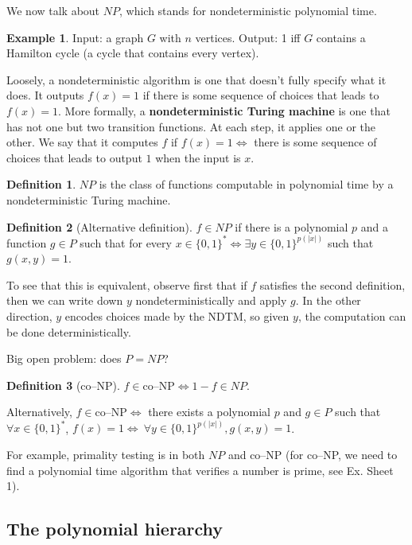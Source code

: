 \documentclass{article}
\theoremstyle{definition}
\newtheorem{example}{Example}[section]
\newtheorem{defn}{Definition}[section]
\begin{document}
We now talk about $NP$, which stands for nondeterministic polynomial time.
\begin{example}
    Input: a graph $G$ with $n$ vertices. Output: 1 iff $G$ contains a Hamilton cycle (a cycle that contains every vertex).
\end{example}
Loosely, a nondeterministic algorithm is one that doesn't fully specify what it does. It outputs $f(x)=1$ if there is some sequence of choices that leads to $f(x)=1$. More formally, a \textbf{nondeterministic Turing machine} is one that has not one but two transition functions. At each step, it applies one or the other. We say that it computes $f$ if $f(x)=1 \iff$ there is some sequence of choices that leads to output $1$ when the input is $x$.
\begin{defn}
    $NP$ is the class of functions computable in polynomial time by a nondeterministic Turing machine.
\end{defn}
\begin{defn}[Alternative definition]
    $f \in NP$ if there is a polynomial $p$ and a function $g \in P$ such that for every $x \in \{0,1\}^{*} \iff \exists y \in \{0,1\}^{p(|x|)}$ such that $g(x,y)=1$.
\end{defn}
To see that this is equivalent, observe first that if $f$ satisfies the second definition, then we can write down $y$ nondeterministically and apply $g$. In the other direction, $y$ encodes choices made by the NDTM, so given $y$, the computation can be done deterministically.
\vspace{1mm}
 
Big open problem: does $P = NP$?

\begin{defn}[co--NP]
    $f \in \text{co--NP} \iff 1-f \in NP$.
    \vspace{1mm}
     
    Alternatively, $f \in \text{co--NP} \iff$ there exists a polynomial $p$ and $g \in P$ such that $\forall x \in \{0,1\}^*$, $f(x)=1 \iff ~\forall y \in \{0,1\}^{p(|x|)}, g(x,y)=1$.
\end{defn}
For example, primality testing is in both $NP$ and co--NP (for co--NP, we need to find a polynomial time algorithm that verifies a number is prime, see Ex. Sheet 1).
\vspace{1mm}
 
\subsection{The polynomial hierarchy}
\end{document}
